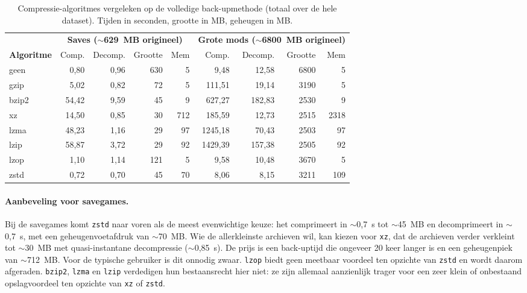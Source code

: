 \begin{table}[h]
    \centering
    \small
    \begin{tabular}{lrrrrrrrr}
        & \multicolumn{4}{c}{\textbf{Saves ($\sim$629~MB origineel)}}
        & \multicolumn{4}{c}{\textbf{Grote mods ($\sim$6800~MB origineel)}} \\
        \cmidrule(lr){2-5}\cmidrule(lr){6-9}
        \textbf{Algoritme} & Comp. & Decomp. & Grootte & Mem
        & Comp. & Decomp. & Grootte & Mem \\
        \midrule
        geen           &   0{,}80  &   0{,}96  &   630 &     5
        &   9{,}48  &  12{,}58  &  6800 &     5 \\
        gzip           &   5{,}02  &   0{,}82  &    72 &     5
        & 111{,}51  &  19{,}14  &  3190 &     5 \\
        bzip2          &  54{,}42  &   9{,}59  &    45 &     9
        & 627{,}27  & 182{,}83  &  2530 &     9 \\
        xz             &  14{,}50  &   0{,}85  &    30 &   712
        & 185{,}59  &  12{,}73  &  2515 &  2318 \\
        lzma           &  48{,}23  &   1{,}16  &    29 &    97
        & 1245{,}18 &  70{,}43  &  2503 &    97 \\
        lzip           &  58{,}87  &   3{,}72  &    29 &    92
        & 1429{,}39 & 157{,}38  &  2505 &    92 \\
        lzop           &   1{,}10  &   1{,}14  &   121 &     5
        &   9{,}58  &  10{,}48  &  3670 &     5 \\
        zstd           &   0{,}72  &   0{,}70  &    45 &    70
        &   8{,}06  &   8{,}15  &  3211 &   109 \\
        \bottomrule
    \end{tabular}
    \caption{Compressie-algoritmes vergeleken op de volledige back-upmethode (totaal over de hele dataset). Tijden in seconden, grootte in MB, geheugen in MB.}
    \label{tab:compressie-summary}
\end{table}

\paragraph{Aanbeveling voor savegames.}
Bij de savegames komt \texttt{zstd} naar voren als de meest evenwichtige keuze: het comprimeert in $\sim$0{,}7~s tot $\sim$45~MB en decomprimeert in $\sim$0{,}7~s, met een geheugenvoetafdruk van $\sim$70~MB. Wie de allerkleinste archieven wil, kan kiezen voor \texttt{xz}, dat de archieven verder verkleint tot $\sim$30~MB met quasi-instantane decompressie ($\sim$0{,}85~s). De prijs is een back-uptijd die ongeveer 20 keer langer is en een geheugenpiek van $\sim$712~MB. Voor de typische gebruiker is dit onnodig zwaar. \texttt{lzop} biedt geen meetbaar voordeel ten opzichte van \texttt{zstd} en wordt daarom afgeraden. \texttt{bzip2}, \texttt{lzma} en \texttt{lzip} verdedigen hun bestaansrecht hier niet: ze zijn allemaal aanzienlijk trager voor een zeer klein of onbestaand opslagvoordeel ten opzichte van \texttt{xz} of \texttt{zstd}.

